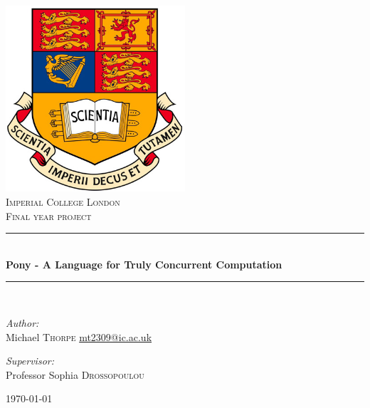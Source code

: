 \documentclass[pdftex,12pt,a4paper]{article}
\newcommand{\HRule}{\rule{\linewidth}{0.5mm}}
\begin{document}
\begin{titlepage}

\begin{center}

\includegraphics[width=0.50\textwidth]{imperial_crest_colour.jpg}\\[1cm]    

\textsc{\LARGE Imperial College London}\\[1.5cm]

\textsc{\Large Final year project}\\[0.5cm]


\HRule \\[0.4cm]
{ \huge \bfseries Pony - A Language for Truly Concurrent Computation}\\[0.4cm]

\HRule \\[1.5cm]

\begin{minipage}{0.4\textwidth}
\begin{flushleft} \large
\emph{Author:}\\
Michael \textsc{Thorpe}
\href{mailto:mt2309@ic.ac.uk}{mt2309@ic.ac.uk}
\end{flushleft}
\end{minipage}
\begin{minipage}{0.4\textwidth}
\begin{flushright} \large
\emph{Supervisor:} \\
Professor Sophia \textsc{Drossopoulou}
\end{flushright}
\end{minipage}

\vfill

{\large \today}

\end{center}

\end{titlepage}
\end{document}
